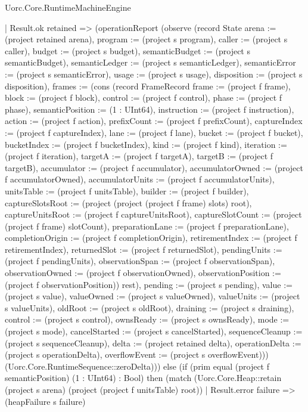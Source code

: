 \begin{lexlean}{Uorc.Core.RuntimeMachineEngine}
\begin{semanticmodule}
{            | Result.ok retained => (operationReport (observe (record State {arena := (project retained arena), program := (project s program), caller := (project s caller), budget := (project s budget), semanticBudget := (project s semanticBudget), semanticLedger := (project s semanticLedger), semanticError := (project s semanticError), usage := (project s usage), disposition := (project s disposition), frames := (cons (record FrameRecord {frame := (project f frame), block := (project f block), control := (project f control), phase := (project f phase), semanticPosition := (1 : UInt64), instruction := (project f instruction), action := (project f action), prefixCount := (project f prefixCount), captureIndex := (project f captureIndex), lane := (project f lane), bucket := (project f bucket), bucketIndex := (project f bucketIndex), kind := (project f kind), iteration := (project f iteration), targetA := (project f targetA), targetB := (project f targetB), accumulator := (project f accumulator), accumulatorOwned := (project f accumulatorOwned), accumulatorUnits := (project f accumulatorUnits), unitsTable := (project f unitsTable), builder := (project f builder), captureSlotsRoot := (project (project (project f frame) slots) root), captureUnitsRoot := (project f captureUnitsRoot), captureSlotCount := (project (project f frame) slotCount), preparationLane := (project f preparationLane), completionOrigin := (project f completionOrigin), retirementIndex := (project f retirementIndex), returnedSlot := (project f returnedSlot), pendingUnits := (project f pendingUnits), observationSpan := (project f observationSpan), observationOwned := (project f observationOwned), observationPosition := (project f observationPosition)}) rest), pending := (project s pending), value := (project s value), valueOwned := (project s valueOwned), valueUnits := (project s valueUnits), oldRoot := (project s oldRoot), draining := (project s draining), control := (project s control), ownsReady := (project s ownsReady), mode := (project s mode), cancelStarted := (project s cancelStarted), sequenceCleanup := (project s sequenceCleanup), delta := (project retained delta), operationDelta := (project s operationDelta), overflowEvent := (project s overflowEvent)})) (Uorc.Core.RuntimeSequence::zeroDelta))) else (if (prim equal (project f semanticPosition) (1 : UInt64) : Bool) then (match (Uorc.Core.Heap::retain (project s arena) (project (project f unitsTable) root))
            | Result.error failure => (heapFailure s failure)
}
\end{semanticmodule}
\end{lexlean}
